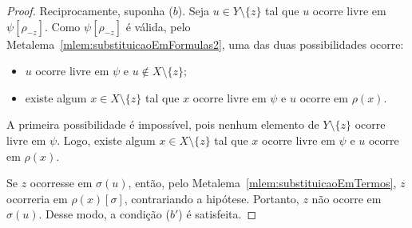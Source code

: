 \begin{proof}
    Reciprocamente, suponha ($b$).
    Seja $u\in Y\setminus\{z\}$ tal que $u$ ocorre livre em $\psi[\rho_{-z}]$.
    Como $\psi[\rho_{-z}]$ é válida, pelo Metalema~\ref{mlem:substituicaoEmFormulas2}, uma das duas possibilidades ocorre:
    \begin{itemize}
        \item $u$ ocorre livre em $\psi$ e $u\notin X\setminus\{z\}$;
        \item existe algum $x\in X\setminus\{z\}$ tal que $x$ ocorre livre em $\psi$ e $u$ ocorre em $\rho(x)$.
    \end{itemize}

    A primeira possibilidade é impossível, pois nenhum elemento de $Y\setminus\{z\}$ ocorre livre em $\psi$.
    Logo, existe algum $x\in X\setminus\{z\}$ tal que $x$ ocorre livre em $\psi$ e $u$ ocorre em $\rho(x)$.

    Se $z$ ocorresse em $\sigma(u)$, então, pelo Metalema~\ref{mlem:substituicaoEmTermos}, $z$ ocorreria em $\rho(x)[\sigma]$, contrariando a hipótese.
    Portanto, $z$ não ocorre em $\sigma(u)$.
    Desse modo, a condição ($b'$) é satisfeita.
\end{proof}


